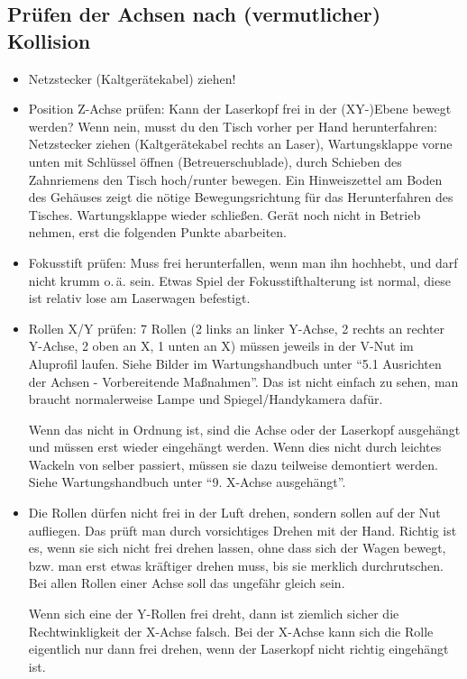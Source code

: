 \documentclass{\basedir/fablab-document}
\begin{document}
\subsection{Prüfen der Achsen nach (vermutlicher) Kollision} \label{sec:wartung-ltt:kollision}
	\begin{itemize}
		\item Netzstecker (Kaltgerätekabel) ziehen!
		\item Position Z-Achse prüfen: Kann der Laserkopf frei in der (XY-)Ebene bewegt werden? Wenn nein, musst du den Tisch vorher per Hand herunterfahren: Netzstecker ziehen (Kaltgerätekabel rechts an Laser), Wartungsklappe vorne unten mit Schlüssel öffnen (Betreuerschublade), durch Schieben des Zahnriemens den Tisch hoch/runter bewegen. Ein Hinweiszettel am Boden des Gehäuses zeigt die nötige Bewegungsrichtung für das Herunterfahren des Tisches. Wartungsklappe wieder schließen. Gerät noch nicht in Betrieb nehmen, erst die folgenden Punkte abarbeiten.
		\item Fokusstift prüfen: Muss frei herunterfallen, wenn man ihn hochhebt, und darf nicht krumm o.\,ä. sein. Etwas Spiel der Fokusstifthalterung ist normal, diese ist relativ lose am Laserwagen befestigt.
		\item Rollen X/Y prüfen: 7 Rollen (2 links an linker Y-Achse, 2 rechts an rechter Y-Achse, 2 oben an X, 1 unten an X) müssen jeweils in der V-Nut im Aluprofil laufen. Siehe Bilder im Wartungshandbuch unter \enquote{5.1 Ausrichten der Achsen - Vorbereitende Maßnahmen}. Das ist nicht einfach zu sehen, man braucht normalerweise Lampe und Spiegel/Handykamera dafür.

		Wenn das nicht in Ordnung ist, sind die Achse oder der Laserkopf ausgehängt und müssen erst wieder eingehängt werden. Wenn dies nicht durch leichtes Wackeln von selber passiert, müssen sie dazu teilweise demontiert werden. Siehe Wartungshandbuch unter \enquote{9. X-Achse ausgehängt}.
		\item Die Rollen dürfen nicht frei in der Luft drehen, sondern sollen auf der Nut aufliegen. Das prüft man durch vorsichtiges Drehen mit der Hand. Richtig ist es, wenn sie sich nicht frei drehen lassen, ohne dass sich der Wagen bewegt, bzw. man erst etwas kräftiger drehen muss, bis sie merklich durchrutschen. 	Bei allen Rollen einer Achse soll das ungefähr gleich sein.

		Wenn sich eine der Y-Rollen frei dreht, dann ist ziemlich sicher die Rechtwinkligkeit der X-Achse falsch. Bei der X-Achse kann sich die Rolle eigentlich nur dann frei drehen, wenn der Laserkopf nicht richtig eingehängt ist.



\end{itemize}
\end{document}
